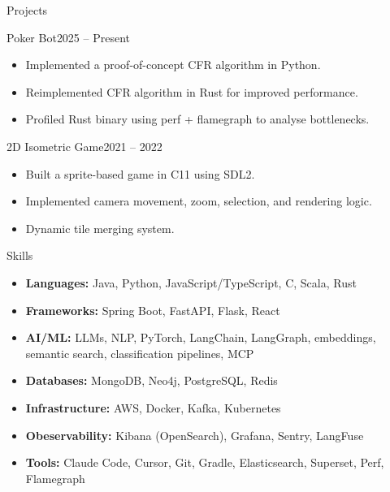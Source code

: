 \documentclass[]{mcdowellcv}
\begin{document}
\begin{cvsection}{Projects}

\begin{cvsubsection}{Poker Bot}{}{2025 -- Present}
\begin{itemize}
\item Implemented a proof-of-concept CFR algorithm in Python.
\item Reimplemented CFR algorithm in Rust for improved performance.
\item Profiled Rust binary using perf + flamegraph to analyse bottlenecks.
\end{itemize}
\end{cvsubsection}

\begin{cvsubsection}{2D Isometric Game}{}{2021 -- 2022}
\begin{itemize}
\item Built a sprite-based game in C11 using SDL2.
\item Implemented camera movement, zoom, selection, and rendering logic.
\item Dynamic tile merging system.
\end{itemize}
\end{cvsubsection}

\end{cvsection}

\begin{cvsection}{Skills}

\begin{cvsubsection}{}{}{}
\begin{itemize}
\item \textbf{Languages:} Java, Python, JavaScript/TypeScript, C, Scala, Rust
\item \textbf{Frameworks:} Spring Boot, FastAPI, Flask, React
\item \textbf{AI/ML:} LLMs, NLP, PyTorch, LangChain, LangGraph, embeddings, semantic search, classification pipelines, MCP
\item \textbf{Databases:} MongoDB, Neo4j, PostgreSQL, Redis
\item \textbf{Infrastructure:} AWS, Docker, Kafka, Kubernetes
\item \textbf{Obeservability:} Kibana (OpenSearch), Grafana, Sentry, LangFuse
\item \textbf{Tools:} Claude Code, Cursor, Git, Gradle, Elasticsearch, Superset, Perf, Flamegraph
\end{itemize}
\end{cvsubsection}

\end{cvsection}
\end{document}
